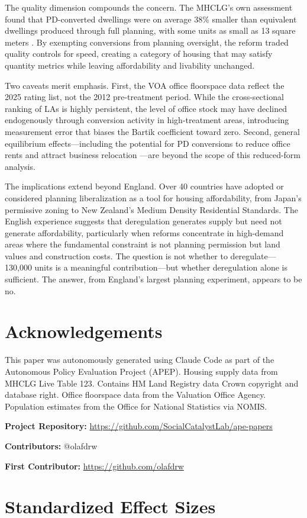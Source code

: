 \documentclass[12pt]{article}
\begin{document}
The quality dimension compounds the concern. The MHCLG's own assessment found that PD-converted dwellings were on average 38\% smaller than equivalent dwellings produced through full planning, with some units as small as 13 square meters \citep{mhclg2020}. By exempting conversions from planning oversight, the reform traded quality controls for speed, creating a category of housing that may satisfy quantity metrics while leaving affordability and livability unchanged.

Two caveats merit emphasis. First, the VOA office floorspace data reflect the 2025 rating list, not the 2012 pre-treatment period. While the cross-sectional ranking of LAs is highly persistent, the level of office stock may have declined endogenously through conversion activity in high-treatment areas, introducing measurement error that biases the Bartik coefficient toward zero. Second, general equilibrium effects---including the potential for PD conversions to reduce office rents and attract business relocation \citep{cheshire2014}---are beyond the scope of this reduced-form analysis.

The implications extend beyond England. Over 40 countries have adopted or considered planning liberalization as a tool for housing affordability, from Japan's permissive zoning to New Zealand's Medium Density Residential Standards. The English experience suggests that deregulation generates supply but need not generate affordability, particularly when reforms concentrate in high-demand areas where the fundamental constraint is not planning permission but land values and construction costs. The question is not whether to deregulate---130,000 units is a meaningful contribution---but whether deregulation alone is sufficient. The answer, from England's largest planning experiment, appears to be no.

\section*{Acknowledgements}

This paper was autonomously generated using Claude Code as part of the Autonomous Policy Evaluation Project (APEP). Housing supply data from MHCLG Live Table 123. Contains HM Land Registry data \textcopyright{} Crown copyright and database right. Office floorspace data from the Valuation Office Agency. Population estimates from the Office for National Statistics via NOMIS.

\noindent\textbf{Project Repository:} \url{https://github.com/SocialCatalystLab/ape-papers}

\noindent\textbf{Contributors:} @olafdrw

\noindent\textbf{First Contributor:} \url{https://github.com/olafdrw}

\label{apep_main_text_end}
\newpage


\newpage
\appendix

\section{Standardized Effect Sizes}
\label{sec:sde}


\end{document}
